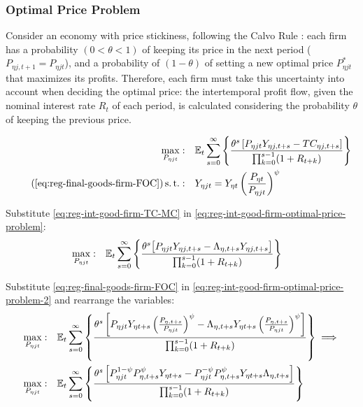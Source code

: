 \documentclass[
thesis.tex
]{subfiles}
\begin{document}

\subsubsection*{Optimal Price Problem}

Consider an economy with price stickiness, following the Calvo Rule \cite{calvo_staggered_1983}: each firm has a probability $(0 < \theta < 1)$ of keeping its price in the next period ($P_{\eta j,t+1} = P_{\eta jt}$), and a probability of $(1 - \theta)$ of setting a new optimal price $P_{\eta jt}^{\ast}$ that maximizes its profits. Therefore, each firm must take this uncertainty into account when deciding the optimal price: the intertemporal profit flow, given the nominal interest rate $R_{t}$ of each period, is calculated considering the probability $\theta$ of keeping the previous price.

\begin{align}
	\label{eq:reg-int-good-firm-optimal-price-problem}
	\max_{P_{\eta jt}}: & \quad \E \sum_{s=0}^{\infty} \left\{ \frac{ \theta^s \left[ P_{\eta jt} Y_{\eta j,t+s} - TC_{\eta j,t+s} \right]}{\prod_{k=0}^{s-1}(1+R_{t+k})} \right\} \\
	\tag{\ref{eq:reg-final-goods-firm-FOC}}
	\st: & \quad Y_{\eta jt} = Y_{\eta t} \left( \frac{P_{\eta t}}{P_{\eta jt}} \right)^{\psi}
\end{align}


Substitute \ref{eq:reg-int-good-firm-TC-MC} in \ref{eq:reg-int-good-firm-optimal-price-problem}:
\begin{align}
	\label{eq:reg-int-good-firm-optimal-price-problem-2}
	\max_{P_{\eta jt}}: & \quad {\mathbb{E}_{t}} \sum_{s=0}^{\infty} \left\{ \frac{\theta^s \big[ P_{\eta jt} Y_{\eta j,t+s} - \Lambda_{\eta, t+s} Y_{\eta j,t+s} \big]}{\prod_{k=0}^{s-1}(1+R_{t+k})} \right\}
\end{align}

Substitute \ref{eq:reg-final-goods-firm-FOC} in \ref{eq:reg-int-good-firm-optimal-price-problem-2} and rearrange the variables:
\begin{align}
	\max_{P_{\eta jt}}: & \quad {\mathbb{E}_{t}} \sum_{s=0}^{\infty} \left\{ \frac{\theta^s \left[ P_{\eta jt} Y_{\eta t+s} \left( \frac{P_{\eta, t+s}}{P_{\eta jt}} \right)^{\psi} - \Lambda_{\eta, t+s} Y_{\eta t+s} \left( \frac{P_{\eta, t+s}}{P_{\eta jt}} \right)^{\psi} \right]}{\prod_{k=0}^{s-1}(1+R_{t+k})} \right\} \implies \nonumber 
	\\
	\max_{P_{\eta jt}}: & \quad {\mathbb{E}_{t}} \sum_{s=0}^{\infty} \left\{ \frac{\theta^s \left[ P_{\eta jt}^{1-\psi} P_{\eta, t+s}^{\psi} Y_{\eta t+s} - P_{\eta jt}^{-\psi} P_{\eta, t+s}^{\psi} Y_{\eta t+s} \Lambda_{\eta, t+s} \right]}{\prod_{k=0}^{s-1}(1+R_{t+k})} \right\} \nonumber
\end{align}
\end{document}
